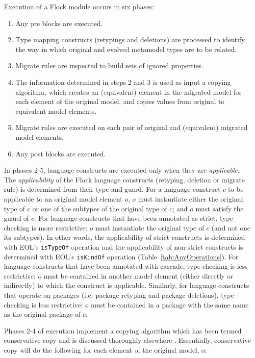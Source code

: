 Execution of a Flock module occurs in six phases:
\begin{enumerate}
  \item Any pre blocks are executed.
  \item Type mapping constructs (retypings and deletions) are processed to identify the way in which original and evolved metamodel types are to be related.
  \item Migrate rules are inspected to build sets of ignored properties.
  \item The information determined in steps 2 and 3 is used as input a copying algorithm, which creates an (equivalent) element in the migrated model for each element of the original model, and copies values from original to equivalent model elements.
  \item Migrate rules are executed on each pair of original and (equivalent) migrated model elements.
  \item Any post blocks are executed.
\end{enumerate}

In phases 2-5, language constructs are executed only when they are \emph{applicable}. The \emph{applicability} of the Flock language constructs (retyping, deletion or migrate rule) is determined from their type and guard. For a language construct $c$ to be applicable to an original model element $o$, $o$ must instantiate either the original type of $c$ or one of the subtypes of the original type of $c$; and $o$ must satisfy the guard of $c$. For language constructs that have been annotated as strict, type-checking is more restrictive: $o$ must instantiate the original type of $c$ (and not one its subtypes). In other words, the applicability of strict constructs is determined with EOL's \texttt{isTypeOf} operation and the applicability of non-strict constructs is determined with EOL's \texttt{isKindOf} operation (Table~\ref{tab:AnyOperations}). For language constructs that have been annotated with cascade, type-checking is less restrictive: $o$ must be contained in another model element (either directly or indirectly) to which the construct is applicable. Similarly, for language constructs that operate on packages (i.e. package retyping and package deletions), type-checking is less restrictive: $o$ must be contained in a package with the same name as the original package of $c$.

Phases 2-4 of execution implement a copying algorithm which has been termed conservative copy and is discussed thoroughly elsewhere \cite{rose12flock}. Essentially, conservative copy will do the following for each element of the original model, $o$:

